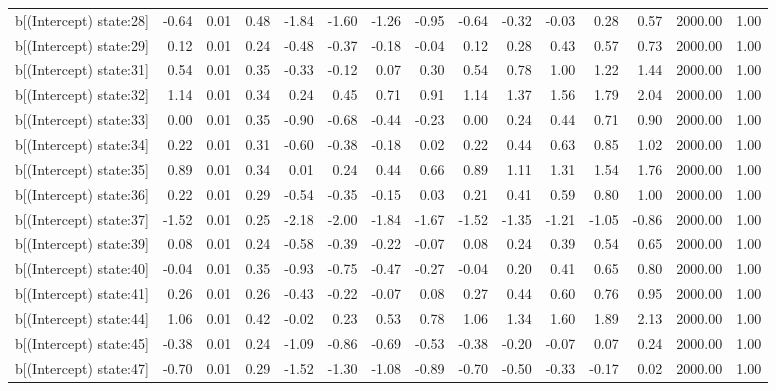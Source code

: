 \begin{table}[ht]
\begin{tabular}{rrrrrrrrrrrrrrr}
  b[(Intercept) state:28] & -0.64 & 0.01 & 0.48 & -1.84 & -1.60 & -1.26 & -0.95 & -0.64 & -0.32 & -0.03 & 0.28 & 0.57 & 2000.00 & 1.00 \\ 
  b[(Intercept) state:29] & 0.12 & 0.01 & 0.24 & -0.48 & -0.37 & -0.18 & -0.04 & 0.12 & 0.28 & 0.43 & 0.57 & 0.73 & 2000.00 & 1.00 \\ 
  b[(Intercept) state:31] & 0.54 & 0.01 & 0.35 & -0.33 & -0.12 & 0.07 & 0.30 & 0.54 & 0.78 & 1.00 & 1.22 & 1.44 & 2000.00 & 1.00 \\ 
  b[(Intercept) state:32] & 1.14 & 0.01 & 0.34 & 0.24 & 0.45 & 0.71 & 0.91 & 1.14 & 1.37 & 1.56 & 1.79 & 2.04 & 2000.00 & 1.00 \\ 
  b[(Intercept) state:33] & 0.00 & 0.01 & 0.35 & -0.90 & -0.68 & -0.44 & -0.23 & 0.00 & 0.24 & 0.44 & 0.71 & 0.90 & 2000.00 & 1.00 \\ 
  b[(Intercept) state:34] & 0.22 & 0.01 & 0.31 & -0.60 & -0.38 & -0.18 & 0.02 & 0.22 & 0.44 & 0.63 & 0.85 & 1.02 & 2000.00 & 1.00 \\ 
  b[(Intercept) state:35] & 0.89 & 0.01 & 0.34 & 0.01 & 0.24 & 0.44 & 0.66 & 0.89 & 1.11 & 1.31 & 1.54 & 1.76 & 2000.00 & 1.00 \\ 
  b[(Intercept) state:36] & 0.22 & 0.01 & 0.29 & -0.54 & -0.35 & -0.15 & 0.03 & 0.21 & 0.41 & 0.59 & 0.80 & 1.00 & 2000.00 & 1.00 \\ 
  b[(Intercept) state:37] & -1.52 & 0.01 & 0.25 & -2.18 & -2.00 & -1.84 & -1.67 & -1.52 & -1.35 & -1.21 & -1.05 & -0.86 & 2000.00 & 1.00 \\ 
  b[(Intercept) state:39] & 0.08 & 0.01 & 0.24 & -0.58 & -0.39 & -0.22 & -0.07 & 0.08 & 0.24 & 0.39 & 0.54 & 0.65 & 2000.00 & 1.00 \\ 
  b[(Intercept) state:40] & -0.04 & 0.01 & 0.35 & -0.93 & -0.75 & -0.47 & -0.27 & -0.04 & 0.20 & 0.41 & 0.65 & 0.80 & 2000.00 & 1.00 \\ 
  b[(Intercept) state:41] & 0.26 & 0.01 & 0.26 & -0.43 & -0.22 & -0.07 & 0.08 & 0.27 & 0.44 & 0.60 & 0.76 & 0.95 & 2000.00 & 1.00 \\ 
  b[(Intercept) state:44] & 1.06 & 0.01 & 0.42 & -0.02 & 0.23 & 0.53 & 0.78 & 1.06 & 1.34 & 1.60 & 1.89 & 2.13 & 2000.00 & 1.00 \\ 
  b[(Intercept) state:45] & -0.38 & 0.01 & 0.24 & -1.09 & -0.86 & -0.69 & -0.53 & -0.38 & -0.20 & -0.07 & 0.07 & 0.24 & 2000.00 & 1.00 \\ 
  b[(Intercept) state:47] & -0.70 & 0.01 & 0.29 & -1.52 & -1.30 & -1.08 & -0.89 & -0.70 & -0.50 & -0.33 & -0.17 & 0.02 & 2000.00 & 1.00 \\ 

\end{tabular}
\end{table}
